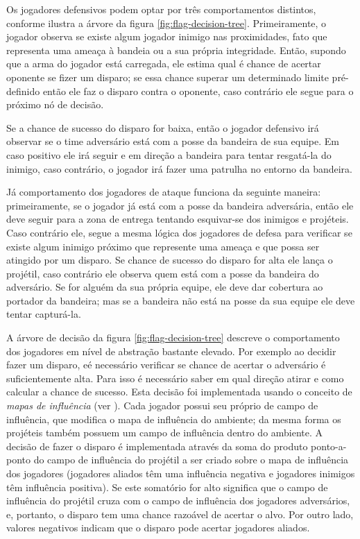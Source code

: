 \documentclass[preprint,12pt]{elsarticle}
\begin{document}
Os jogadores defensivos podem optar por três comportamentos distintos, conforme ilustra a árvore da figura \ref{fig:flag-decision-tree}. Primeiramente, o jogador observa se existe algum jogador inimigo nas proximidades, fato que representa uma ameaça à bandeia ou a sua própria integridade. Então, supondo que a arma do jogador está carregada, ele estima qual é chance de acertar oponente se fizer um disparo; se essa chance superar um determinado limite pré-definido então ele faz o disparo contra o oponente, caso contrário ele segue para o próximo nó de decisão.

Se a chance de sucesso do disparo for baixa, então o jogador defensivo irá observar se o time adversário está com a posse da bandeira de sua equipe. Em caso positivo ele irá seguir e em direção a bandeira para tentar resgatá-la do inimigo, caso contrário, o jogador irá fazer uma patrulha no entorno da bandeira.

Já comportamento dos jogadores de ataque funciona da seguinte maneira: primeiramente, se o jogador já está com a posse da bandeira adversária, então ele deve seguir para a zona de entrega tentando esquivar-se dos inimigos e projéteis. Caso contrário ele, segue a mesma lógica dos jogadores de defesa para verificar se existe algum inimigo próximo que represente uma ameaça e que possa ser atingido por um disparo. Se chance de sucesso do disparo for alta ele lança o projétil, caso contrário ele observa quem está com a posse da bandeira do adversário. Se for alguém da sua própria equipe, ele deve dar cobertura ao portador da bandeira; mas se a bandeira não está na posse da sua equipe ele deve tentar capturá-la.

A árvore de decisão da figura \ref{fig:flag-decision-tree} descreve o comportamento dos jogadores em nível de abstração bastante elevado. Por exemplo ao decidir fazer um disparo, eé necessário verificar se chance de acertar o adversário é suficientemente alta. Para isso é necessário saber em qual direção atirar e como calcular a chance de sucesso. Esta decisão foi implementada usando o conceito de \textit{mapas de influência} (ver \cite{millington2016artificial}). Cada jogador possui seu próprio de campo de influência, que modifica o mapa de influência do ambiente; da mesma forma os projéteis também possuem um campo de influência dentro do ambiente. A decisão de fazer o disparo é implementada através da soma do produto ponto-a-ponto do campo de influência do projétil a ser criado sobre o mapa de influência dos jogadores (jogadores aliados têm uma influência negativa e jogadores inimigos têm influência positiva). Se este somatório for alto significa que o campo de influência do projétil cruza com o campo de influência dos jogadores adversários, e, portanto, o disparo tem uma chance razoável de acertar o alvo. Por outro lado, valores negativos indicam que o disparo pode acertar jogadores aliados.
\end{document}
